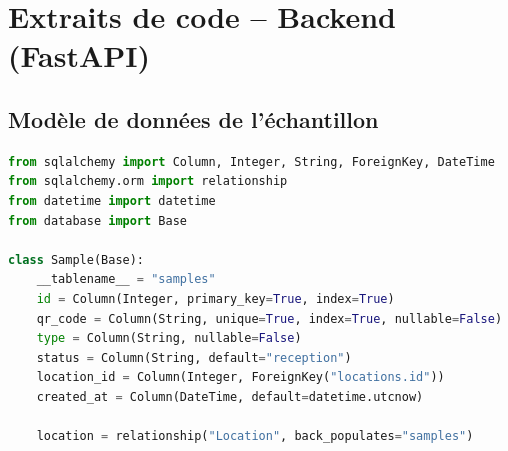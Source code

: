 \documentclass[12pt,a4paper,oneside]{report}
\begin{document}
\section{Extraits de code -- Backend (FastAPI)}

\subsection{Modèle de données de l'échantillon}
\begin{lstlisting}[language=Python,caption={Modele SQLAlchemy de l'entite Sample}]
from sqlalchemy import Column, Integer, String, ForeignKey, DateTime
from sqlalchemy.orm import relationship
from datetime import datetime
from database import Base

class Sample(Base):
    __tablename__ = "samples"
    id = Column(Integer, primary_key=True, index=True)
    qr_code = Column(String, unique=True, index=True, nullable=False)
    type = Column(String, nullable=False)
    status = Column(String, default="reception")
    location_id = Column(Integer, ForeignKey("locations.id"))
    created_at = Column(DateTime, default=datetime.utcnow)

    location = relationship("Location", back_populates="samples")
\end{lstlisting}
\end{document}
